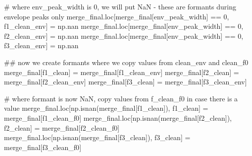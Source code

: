 \documentclass[
  letterpaper,
  DIV=11,
  numbers=noendperiod]{scrreprt}
\newenvironment{Shaded}{\begin{snugshade}}{\end{snugshade}}
\newcommand{\CommentTok}[1]{\textcolor[rgb]{0.37,0.37,0.37}{#1}}
\newcommand{\DecValTok}[1]{\textcolor[rgb]{0.68,0.00,0.00}{#1}}
\newcommand{\NormalTok}[1]{\textcolor[rgb]{0.00,0.23,0.31}{#1}}
\newcommand{\OperatorTok}[1]{\textcolor[rgb]{0.37,0.37,0.37}{#1}}
\newcommand{\StringTok}[1]{\textcolor[rgb]{0.13,0.47,0.30}{#1}}
\begin{document}
\begin{Shaded}
\begin{Highlighting}[]
    \CommentTok{\# where env\_peak\_width is 0, we will put NaN {-} these are formants during envelope peaks only}
\NormalTok{    merge\_final.loc[merge\_final[}\StringTok{\textquotesingle{}env\_peak\_width\textquotesingle{}}\NormalTok{] }\OperatorTok{==} \DecValTok{0}\NormalTok{, }\StringTok{\textquotesingle{}f1\_clean\_env\textquotesingle{}}\NormalTok{] }\OperatorTok{=}\NormalTok{ np.nan}
\NormalTok{    merge\_final.loc[merge\_final[}\StringTok{\textquotesingle{}env\_peak\_width\textquotesingle{}}\NormalTok{] }\OperatorTok{==} \DecValTok{0}\NormalTok{, }\StringTok{\textquotesingle{}f2\_clean\_env\textquotesingle{}}\NormalTok{] }\OperatorTok{=}\NormalTok{ np.nan}
\NormalTok{    merge\_final.loc[merge\_final[}\StringTok{\textquotesingle{}env\_peak\_width\textquotesingle{}}\NormalTok{] }\OperatorTok{==} \DecValTok{0}\NormalTok{, }\StringTok{\textquotesingle{}f3\_clean\_env\textquotesingle{}}\NormalTok{] }\OperatorTok{=}\NormalTok{ np.nan}

    \CommentTok{\#\# now we create formants where we copy values from clean\_env and clean\_f0}
\NormalTok{    merge\_final[}\StringTok{\textquotesingle{}f1\_clean\textquotesingle{}}\NormalTok{] }\OperatorTok{=}\NormalTok{ merge\_final[}\StringTok{\textquotesingle{}f1\_clean\_env\textquotesingle{}}\NormalTok{]}
\NormalTok{    merge\_final[}\StringTok{\textquotesingle{}f2\_clean\textquotesingle{}}\NormalTok{] }\OperatorTok{=}\NormalTok{ merge\_final[}\StringTok{\textquotesingle{}f2\_clean\_env\textquotesingle{}}\NormalTok{]}
\NormalTok{    merge\_final[}\StringTok{\textquotesingle{}f3\_clean\textquotesingle{}}\NormalTok{] }\OperatorTok{=}\NormalTok{ merge\_final[}\StringTok{\textquotesingle{}f3\_clean\_env\textquotesingle{}}\NormalTok{]}

    \CommentTok{\# where formant is now NaN, copy values from f\_clean\_f0 in case there is a value}
\NormalTok{    merge\_final.loc[np.isnan(merge\_final[}\StringTok{\textquotesingle{}f1\_clean\textquotesingle{}}\NormalTok{]), }\StringTok{\textquotesingle{}f1\_clean\textquotesingle{}}\NormalTok{] }\OperatorTok{=}\NormalTok{ merge\_final[}\StringTok{\textquotesingle{}f1\_clean\_f0\textquotesingle{}}\NormalTok{]}
\NormalTok{    merge\_final.loc[np.isnan(merge\_final[}\StringTok{\textquotesingle{}f2\_clean\textquotesingle{}}\NormalTok{]), }\StringTok{\textquotesingle{}f2\_clean\textquotesingle{}}\NormalTok{] }\OperatorTok{=}\NormalTok{ merge\_final[}\StringTok{\textquotesingle{}f2\_clean\_f0\textquotesingle{}}\NormalTok{]}
\NormalTok{    merge\_final.loc[np.isnan(merge\_final[}\StringTok{\textquotesingle{}f3\_clean\textquotesingle{}}\NormalTok{]), }\StringTok{\textquotesingle{}f3\_clean\textquotesingle{}}\NormalTok{] }\OperatorTok{=}\NormalTok{ merge\_final[}\StringTok{\textquotesingle{}f3\_clean\_f0\textquotesingle{}}\NormalTok{]}


\end{Highlighting}
\end{Shaded}
\end{document}
